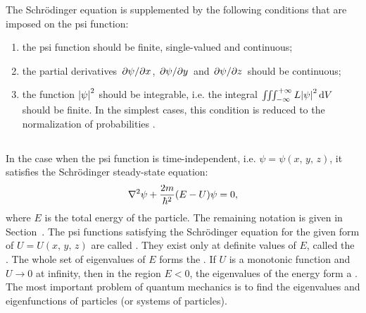 The Schr\"odinger equation is supplemented by the following
conditions that are imposed on the psi function:
\begin{enumerate}[label=(\alph*),noitemsep]
\item the psi function should be finite, single-valued and continuous;
\item the partial derivatives $\pdv*{\psi}{x}$, $\pdv*{\psi}{y}$ and $\pdv*{\psi}{z}$ should be continuous;
\item the function $\abs{\psi}^{2}$ should be integrable, i.e. the integral $\iiint^{+\infty}_{-\infty} L \abs{\psi}^{2}\, \dd V $ should be finite. In the simplest cases, this condition is reduced to the normalization of probabilities .
\end{enumerate}

\subsection{}\label{38.2.5} In the case when the psi function is time-independent, i.e. $\psi = \psi(x,\, y,\, z)$, it satisfies the Schr\"odinger steady-state equation:
\begin{equation*}%
\laplacian \psi + \frac{2m}{\hbar^{2}} (E - U) \psi = 0,
\end{equation*}
where $E$ is the total energy of the particle. The remaining notation is given in Section~. The psi functions satisfying the Schr\"odinger equation for the given form of $U = U (x,\, y,\, z)$ are called . They exist only at definite values of $E$, called the . The whole set of eigenvalues of $E$ forms the . If $U$ is a monotonic function and $U \to 0$ at infinity, then in the region $E < 0$, the eigenvalues of the energy form a . The most important problem of quantum mechanics is to find the eigenvalues and eigenfunctions of particles (or systems of particles).


